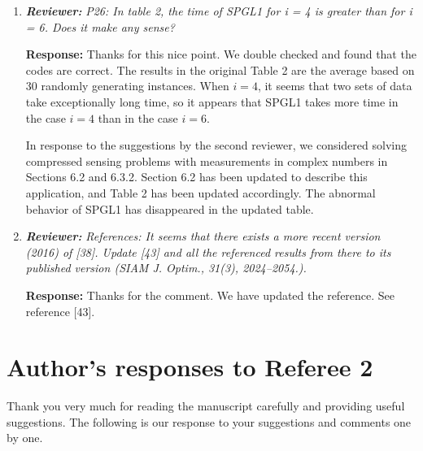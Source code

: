 \documentclass{article}
\begin{document}
\begin{enumerate}
    \item  \textit{\textbf{Reviewer:}} \textit{P26: In table 2, the time of SPGL1 for i = 4 is greater than for i = 6. Does it make any sense?}
	
	\textbf{Response:} Thanks for this nice point. We double checked and found that the codes are correct. The results in the original Table 2 are the average based on 30 randomly generating instances. When $i = 4$, it seems that two sets of data take exceptionally long time, so it appears that SPGL1 takes more time in the case $i = 4$ than in the case $i = 6$.

In response to the suggestions by the second reviewer, we considered solving compressed sensing problems with measurements in complex numbers in Sections 6.2 and 6.3.2. Section 6.2 has been updated to describe this application, and Table 2 has been updated accordingly. The abnormal behavior of SPGL1 has disappeared in the updated table.

    \item  \textit{\textbf{Reviewer:}} \textit{References: It seems that there exists a more recent version (2016) of [38]. Update [43] and all the referenced results from there to its published version (SIAM J. Optim., 31(3), 2024--2054.).}
	
	\textbf{Response:} Thanks for the comment. We have updated the reference. See reference [43].






\end{enumerate}


\section*{Author's responses to Referee 2}
Thank you very much for reading the manuscript carefully and providing useful suggestions. The following is our response to your suggestions and comments one by one.
\end{document}
